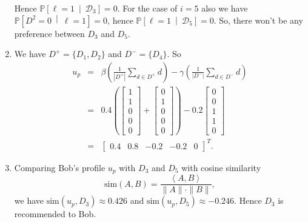 \documentclass[DIN, pagenumber=false, fontsize=11pt, parskip=half]{scrartcl}
\newcommand{\probm}[2]{\mathbb{P}\left[ #1 ~\middle|~ #2 \right]}
\newcommand{\D}{\mathcal{D}}
\begin{document}
\begin{enumerate}[label=(\alph*)]
Hence $\probm{\ell = 1}{\D_3} = 0$. For the case of $i = 5$ also we have $\probm{D^2 = 0}{\ell=1} = 0$, hence $\probm{\ell = 1}{\D_5} = 0$. So, there won't be any preference between $D_3$ and $D_5$.

\item %

We have $D^+ = \{D_1, D_2\}$ and $D^- = \{D_4\}$. So
\begin{eqnarray*}
u_p &=& \beta \left( \frac{1}{|D^+|} \sum_{d \in D^+} d \right) - \gamma \left( \frac{1}{|D^-|} \sum_{d \in D^-} d \right) \\
&=& 0.4 \left( \begin{bmatrix} 1 \\ 1 \\ 0 \\ 0 \\ 0 \end{bmatrix} + \begin{bmatrix} 0 \\ 1 \\ 0 \\ 0 \\ 0 \end{bmatrix} \right) - 0.2 \begin{bmatrix} 0 \\ 0 \\ 1 \\ 1 \\ 0 \end{bmatrix} \\
&=& \begin{bmatrix} 0.4 & 0.8 & -0.2 & -0.2 & 0 \end{bmatrix}^T.
\end{eqnarray*}

\item
Comparing Bob's profile $u_p$ with $D_3$ and $D_5$ with cosine similarity
\[
\mathrm{sim}(A, B) = \frac{\left\langle A, B \right\rangle}{\|A\| \cdot \|B\|},
\]
we have $\mathrm{sim}(u_p, D_3) \approx 0.426$ and $\mathrm{sim}(u_p, D_5) \approx -0.246$. Hence $D_3$ is recommended to Bob.

\end{enumerate}
\end{document}
